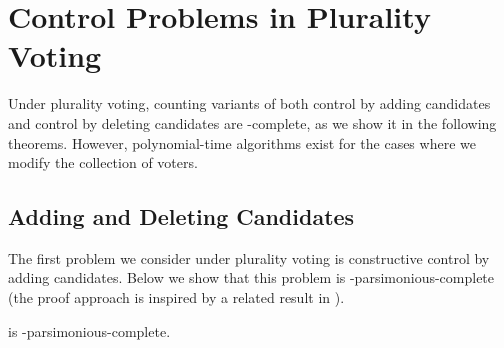 \chapter{Control Problems in Plurality Voting} \label{ch:plurality}

Under plurality voting, counting variants of both control by adding candidates and control by deleting candidates are \sharpPclass-complete, as we show it in the following theorems.
However, polynomial-time algorithms exist for the cases where we modify the collection of voters.

\section{Adding and Deleting Candidates} \label{sec:plcan}

The first problem we consider under plurality voting is constructive control by adding candidates.
Below we show that this problem is \sharpPclass-parsimonious-complete (the proof approach is inspired by a related result in \cite{faliszewski7}).

\begin{theorem} \label{th:placc}
     is \sharpPclass-parsimonious-complete.
\end{theorem}

